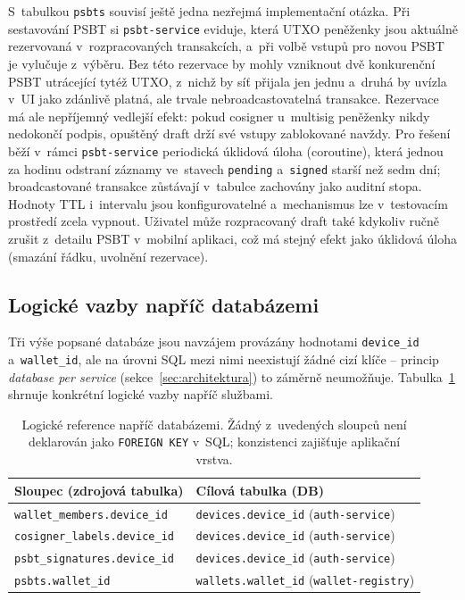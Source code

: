 S~tabulkou \texttt{psbts} souvisí ještě jedna nezřejmá implementační
otázka. Při sestavování PSBT si \texttt{psbt-service} eviduje, která UTXO
peněženky jsou aktuálně rezervovaná v~rozpracovaných transakcích, a~při
volbě vstupů pro novou PSBT je vylučuje z~výběru. Bez této rezervace by
mohly vzniknout dvě konkurenční PSBT utrácející tytéž UTXO, z~nichž by
síť přijala jen jednu a~druhá by uvízla v~UI jako zdánlivě platná, ale
trvale nebroadcastovatelná transakce. Rezervace má ale nepříjemný
vedlejší efekt: pokud cosigner u~multisig peněženky nikdy nedokončí
podpis, opuštěný draft drží své vstupy zablokované navždy. Pro řešení
běží v~rámci \texttt{psbt-service} periodická úklidová úloha
(coroutine), která jednou za hodinu odstraní záznamy ve~stavech
\texttt{pending} a~\texttt{signed} starší než sedm dní; broadcastované
transakce zůstávají v~tabulce zachovány jako auditní stopa.
Hodnoty TTL i~intervalu jsou konfigurovatelné a~mechanismus lze
v~testovacím prostředí zcela vypnout. Uživatel může rozpracovaný
draft také kdykoliv ručně zrušit z~detailu PSBT v~mobilní aplikaci,
což má stejný efekt jako úklidová úloha (smazání řádku, uvolnění
rezervace).

\subsection{Logické vazby napříč databázemi}
\label{subsec:cross-db-references}

Tři výše popsané databáze jsou navzájem provázány hodnotami
\texttt{device\_id} a~\texttt{wallet\_id}, ale na úrovni SQL mezi nimi
neexistují žádné cizí klíče -- princip \emph{database per service}
(sekce~\ref{sec:architektura}) to záměrně neumožňuje. Tabulka~\ref{tab:cross-db-refs}
shrnuje konkrétní logické vazby napříč službami.

\begin{table}[htbp]
\centering
\caption[Logické reference napříč databázemi]{Logické reference napříč
databázemi. Žádný z~uvedených sloupců není deklarován jako
\texttt{FOREIGN KEY} v~SQL; konzistenci zajišťuje aplikační vrstva.}
\label{tab:cross-db-refs}
\footnotesize
\begin{tabular}{|l|l|}
\hline
\textbf{Sloupec (zdrojová tabulka)} & \textbf{Cílová tabulka (DB)} \\
\hline
\texttt{wallet\_members.device\_id}      & \texttt{devices.device\_id} (\texttt{auth-service}) \\
\texttt{cosigner\_labels.device\_id}     & \texttt{devices.device\_id} (\texttt{auth-service}) \\
\texttt{psbt\_signatures.device\_id}     & \texttt{devices.device\_id} (\texttt{auth-service}) \\
\texttt{psbts.wallet\_id}                & \texttt{wallets.wallet\_id} (\texttt{wallet-registry}) \\
\hline
\end{tabular}
\normalsize
\end{table}

